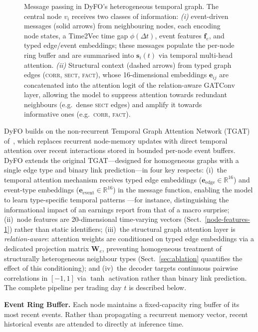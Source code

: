 \documentclass[runningheads]{llncs}
\begin{document}
\begin{figure}[ht]
\caption{%
  Message passing in DyFO's heterogeneous temporal graph.   The central node \(v_i\) receives two classes of information:  \emph{(i)} event-driven messages (solid arrows) from neighbouring nodes, each encoding node states, a Time2Vec time gap \(\phi(\Delta t)\), event features \(\mathbf{f}_e\), and typed edge/event embeddings; these messages populate the per-node ring buffer and are summarised into \(\mathbf{s}_i(t)\) via temporal multi-head attention. \emph{(ii)} Structural context (dashed arrows) from typed graph edges ({\scshape corr}, {\scshape sect}, {\scshape fact}), whose 16-dimensional embeddings \(\mathbf{e}_{ij}\) are concatenated into the attention logit of the relation-aware GATConv layer, allowing the model to suppress attention towards redundant neighbours (e.g.\ dense {\scshape sect} edges) and amplify it towards informative ones (e.g.\ {\scshape corr}, {\scshape fact}).%
}
\label{fig:dyfo_message_passing}
\end{figure}


DyFO builds on the non-recurrent Temporal Graph Attention Network (TGAT) of~\cite{xu2020inductive}, which replaces recurrent node-memory updates with direct temporal attention over recent interactions stored in bounded per-node event buffers. DyFO extends the original TGAT---designed for homogeneous graphs with a single edge type and binary link prediction---in four key respects: (i)~the temporal attention mechanism receives typed edge embeddings ($\mathbf{e}_{\text{edge}} \in \mathbb{R}^{16}$) and event-type embeddings ($\mathbf{e}_{\text{event}} \in \mathbb{R}^{16}$) in the message function, enabling the model to learn type-specific temporal patterns ---for instance, distinguishing the informational impact of an earnings report from that of a macro surprise; (ii)~node features are 20-dimensional time-varying vectors (Sect.~\ref{node-features-1}) rather than static identifiers; (iii)~the structural graph attention layer is \emph{relation-aware}: attention weights are conditioned on typed edge embeddings via a dedicated projection matrix $\mathbf{W}_e$, preventing homogeneous treatment of structurally heterogeneous neighbour types (Sect.~\ref{sec:ablation} quantifies the effect of this conditioning); and (iv)~the decoder targets continuous pairwise correlations in $[-1,1]$ via $\tanh$ activation rather than binary link prediction. The complete pipeline per trading day $t$ is described below.

\textbf{Event Ring Buffer.} Each node maintains a fixed-capacity ring buffer of its most recent events. Rather than propagating a recurrent memory vector, recent historical events are attended to directly at inference time.
\end{document}
